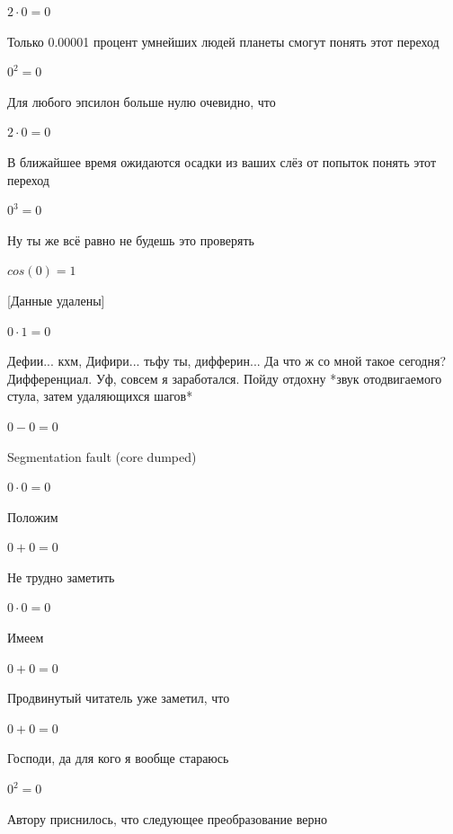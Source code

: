 \documentclass[12pt,a4paper,fleqn]{article}
\begin{document}
\begin{center}$2 \cdot 0 = 0$\end{center}
Только 0.00001 процент умнейших людей планеты смогут понять этот переход

\begin{center}$0^{2} = 0$\end{center}
Для любого эпсилон больше нулю очевидно, что

\begin{center}$2 \cdot 0 = 0$\end{center}
В ближайшее время ожидаются осадки из ваших слёз от попыток понять этот переход

\begin{center}$0^{3} = 0$\end{center}
Ну ты же всё равно не будешь это проверять

\begin{center}$cos(0) = 1$\end{center}
[Данные удалены]

\begin{center}$0 \cdot 1 = 0$\end{center}
Дефии... кхм, Дифири... тьфу ты, дифферин... Да что ж со мной такое сегодня? Дифференциал. Уф, совсем я заработался. Пойду отдохну *звук отодвигаемого стула, затем удаляющихся шагов*

\begin{center}$0-0 = 0$\end{center}
Segmentation fault (core dumped)

\begin{center}$0 \cdot 0 = 0$\end{center}
Положим

\begin{center}$0+0 = 0$\end{center}
Не трудно заметить

\begin{center}$0 \cdot 0 = 0$\end{center}
Имеем

\begin{center}$0+0 = 0$\end{center}
Продвинутый читатель уже заметил, что

\begin{center}$0+0 = 0$\end{center}
Господи, да для кого я вообще стараюсь

\begin{center}$0^{2} = 0$\end{center}
Автору приснилось, что следующее преобразование верно
\end{document}
